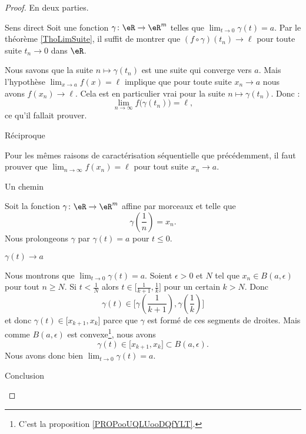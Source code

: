 \begin{proof}
    En deux parties.
    \begin{subproof}
        \item[Sens direct]
            Soit une fonction \( \gamma\colon \eR\to \eR^m\) telles que \( \lim_{t\to 0} \gamma(t)=a\). Par le théorème \ref{ThoLimSuite}, il suffit de montrer que \( (f\circ\gamma)(t_n)\to\ell\) pour toute suite \( t_n\to 0\) dans \( \eR\).

            Nous savons que la suite \( n\mapsto \gamma(t_n)\) est une suite qui converge vers \( a\). Mais l'hypothèse \( \lim_{x\to a} f(x)=\ell\) implique que pour toute suite \( x_n\to a\) nous avons \( f(x_n)\to \ell\). Cela est en particulier vrai pour la suite \( n\mapsto \gamma(t_n)\). Donc :
            \begin{equation}
                \lim_{n\to \infty} f\big( \gamma(t_n) \big)=\ell,
            \end{equation}
            ce qu'il fallait prouver.
        \item[Réciproque]

            Pour les mêmes raisons de caractérisation séquentielle que précédemment, il faut prouver que \( \lim_{n\to \infty} f(x_n)=\ell\) pour tout suite \( x_n\to a\).
            
            \begin{subproof}
                \item[Un chemin]

                    Soit la fonction \( \gamma\colon \eR\to \eR^m\) affine par morceaux et telle que 
                    \begin{equation}
                        \gamma\left( \frac{1}{ n } \right)=x_n.
                    \end{equation}
                    Nous prolongeons \( \gamma\) par \( \gamma(t)=a\) pour \( t\leq 0\).

                \item[\( \gamma(t)\to a\)]

                    Nous montrons que \( \lim_{t\to 0} \gamma(t)=a\). Soient \( \epsilon>0\) et \( N\) tel que \( x_n\in B(a,\epsilon)\) pour tout \( n\geq N\). Si \( t<\frac{1}{ N }\) alors \( t\in\mathopen[ \frac{1}{ k+1 } , \frac{1}{ k } \mathclose]\) pour un certain \( k>N\). Donc
                    \begin{equation}
                        \gamma(t)\in\mathopen[ \gamma(\frac{1}{ k+1 }) , \gamma(\frac{1}{ k }) \mathclose]
                    \end{equation}
                    et donc \( \gamma(t)\in\mathopen[ x_{k+1} , x_k \mathclose]\) parce que \( \gamma\) est formé de ces segments de droites. Mais comme \( B(a,\epsilon)\) est convexe\footnote{C'est la proposition \ref{PROPooUQLUooDQfYLT}.}, nous avons 
                    \begin{equation}
                        \gamma(t)\in\mathopen[ x_{k+1} , x_k \mathclose]\subset B(a,\epsilon).
                    \end{equation}
                    Nous avons donc bien \( \lim_{t\to 0} \gamma(t)=a\).
                \item[Conclusion]


\end{subproof}
\end{subproof}
\end{proof}
